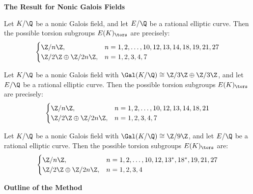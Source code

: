 \begin{frame}[plain]
\vfill
\begin{center} {\bfseries \Large \textcolor{UniGray}{The Result for Nonic Galois Fields}} \end{center}
\vfill 
\end{frame}



\begin{frame}[plain]
\begin{thm}[M.]
Let $K/\Q$ be a nonic Galois field, and let $E/\Q$ be a rational elliptic curve. Then the possible torsion subgroups $E(K)_\tors$ are precisely:
	\[
	\begin{cases}
	\Z/n\Z, & n=1,2,\ldots,10,12,13,14,18,19,21,27 \\
	\Z/2\Z \oplus \Z/2n\Z, & n=1,2,3,4,7
	\end{cases}
	\]
\end{thm}
\end{frame}



\begin{frame}[plain]
\begin{thm}[M.]
Let $K/\Q$ be a nonic Galois field with $\Gal(K/\Q) \cong \Z/3\Z \oplus \Z/3\Z$, and let $E/\Q$ be a rational elliptic curve. Then the possible torsion subgroups $E(K)_\tors$ are precisely:
	\[
	\begin{cases}
	\Z/n\Z, & n=1,2,\ldots,10,12,13,14,18,21 \\
	\Z/2\Z \oplus \Z/2n\Z, & n=1,2,3,4,7
	\end{cases}
	\]
\end{thm}
\end{frame}



\begin{frame}[plain]
\begin{thm}[M.]
Let $K/\Q$ be a nonic Galois field with $\Gal(K/\Q) \cong \Z/9\Z$, and let $E/\Q$ be a rational elliptic curve. Then the possible torsion subgroups $E(K)_\tors$ are:
	\[
	\begin{cases}
	\Z/n\Z, & n=1,2,\ldots,10,12,13^*,18^*,19,21,27 \\
	\Z/2\Z \oplus \Z/2n\Z, & n=1,2,3,4
	\end{cases}
	\]
\end{thm}
\end{frame}



\begin{frame}[plain]
\vfill
\begin{center} {\bfseries \Large \textcolor{UniGray}{Outline of the Method}} \end{center}
\vfill 
\end{frame}



